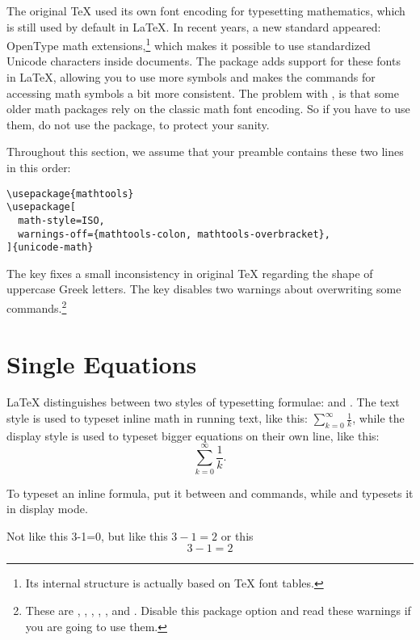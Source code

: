 The original \TeX{} used its own font encoding for typesetting mathematics,
which is still used by default in \LaTeX{}. In recent years, a new standard
appeared: OpenType math extensions,\footnote{Its internal structure is actually
  based on \TeX{} font tables.} which makes it possible to use standardized
Unicode characters inside documents. The  package adds
support for these fonts in \LaTeX{}, allowing you to use more symbols and makes
the commands for accessing math symbols a bit more consistent. The problem with
, is that some older math packages rely on the
classic math font encoding. So if you have to use them, do not use the
 package, to protect your sanity.

Throughout this section, we assume that your preamble contains these two
lines in this order:
\begin{verbatim}
\usepackage{mathtools}
\usepackage[
  math-style=ISO,
  warnings-off={mathtools-colon, mathtools-overbracket},
]{unicode-math}
\end{verbatim}
The  key fixes a small inconsistency in original \TeX{}
regarding the shape of uppercase Greek letters. The  key
disables two warnings about overwriting some 
commands.\footnote{These are , ,
  , , ,  and
  . Disable this package option and read these warnings if you are
  going to use them.}

\section{Single Equations}\label{sec:single_equations}

\LaTeX{} distinguishes between two styles of typesetting formulae:
\emph{} and \emph{}. The text style is used to
typeset inline math in running text, like this: \(\sum_{k=0}^\infty
\frac{1}{k}\), while the display style is used to typeset bigger equations on
their own line, like this:
\[
  \sum_{k=0}^\infty \frac{1}{k}.
\]

To typeset an inline formula, put it between \csi{(} and \csi{)} commands, while
\csi{[} and \csi{]} typesets it in display mode.
\begin{chktexignore}
\begin{example}
Not like this 3-1=0,
but like this \(3-1=2\)
or this
\[
  3 - 1 = 2
\]
\end{example}
\end{chktexignore}

